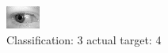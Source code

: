 \begin{figure}[h!]
\begin{center}
\includegraphics[width=0.60\columnwidth]{figures/ID728_class_3_target_4.png}
\end{center}
\caption{ Classification: 3 actual target: 4}
\label{fig:ID728_class_3_target_4}
\end{figure}

